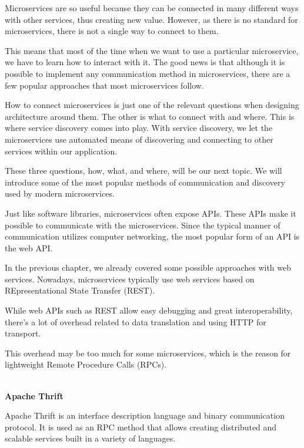 
Microservices are so useful because they can be connected in many different ways with other services, thus creating new value. However, as there is no standard for microservices, there is not a single way to connect to them.

This means that most of the time when we want to use a particular microservice, we have to learn how to interact with it. The good news is that although it is possible to implement any communication method in microservices, there are a few popular approaches that most microservices follow.

How to connect microservices is just one of the relevant questions when designing architecture around them. The other is what to connect with and where. This is where service discovery comes into play. With service discovery, we let the microservices use automated means of discovering and connecting to other services within our application.

These three questions, how, what, and where, will be our next topic. We will introduce some of the most popular methods of communication and discovery used by modern microservices.


Just like software libraries, microservices often expose APIs. These APIs make it possible to communicate with the microservices. Since the typical manner of communication utilizes computer networking, the most popular form of an API is the web API.

In the previous chapter, we already covered some possible approaches with web services. Nowadays, microservices typically use web services based on REpresentational State Transfer (REST).


While web APIs such as REST allow easy debugging and great interoperability, there's a lot of overhead related to data translation and using HTTP for transport.

This overhead may be too much for some microservices, which is the reason for lightweight Remote Procedure Calls (RPCs).

\hspace*{\fill} \\ %
\noindent
\textbf{Apache Thrift}

Apache Thrift is an interface description language and binary communication protocol. It is used as an RPC method that allows creating distributed and scalable services built in a variety of languages.

